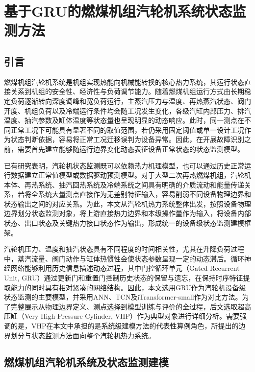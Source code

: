 \section{基于GRU的燃煤机组汽轮机系统状态监测方法}
\label{sec:gru_monitoring}

\subsection{引言}

燃煤机组汽轮机系统是机组实现热能向机械能转换的核心热力系统，其运行状态直接关系到机组的安全性、经济性与负荷调节能力。随着燃煤机组运行方式由长期稳定负荷逐渐转向深度调峰和宽负荷运行，主蒸汽压力与温度、再热蒸汽状态、阀门开度、机组负荷以及冷端运行条件均会随工况发生变化，各级汽缸内部压力、排汽温度、抽汽参数及缸体温度等状态量也呈现明显的动态响应。此时，同一测点在不同正常工况下可能具有显著不同的取值范围，若仍采用固定阈值或单一设计工况作为状态判断依据，容易将正常工况迁移误判为设备异常。因此，在开展故障识别之前，需要首先建立能够随运行边界变化动态表征设备正常状态的状态监测模型。

已有研究表明，汽轮机状态监测既可以依赖热力机理模型，也可以通过历史正常运行数据建立正常值模型或数据驱动预测模型\cite{Dettori2017MonitoringModels,Cao2016LastStageNormalValue,Yu2020HybridDigitalTwin}。对于大型二次再热燃煤机组，汽轮机本体、再热系统、抽汽回热系统及冷端系统之间具有明确的介质流动和能量传递关系，若将全系统大量测点直接作为无差别特征输入，容易削弱不同设备物理边界和状态输出之间的对应关系。为此，本文从汽轮机热力系统整体出发，按照设备物理边界划分状态监测对象，将上游直接热力边界和本级操作量作为输入，将设备内部状态、出口状态及关键热力接口状态作为输出，形成统一的设备级状态监测建模框架。

汽轮机压力、温度和抽汽状态具有不同程度的时间相关性，尤其在升降负荷过程中，蒸汽流量、阀门动作与缸体热惯性会使状态参数呈现一定的动态滞后。循环神经网络能够利用历史信息描述动态过程，其中门控循环单元（Gated Recurrent Unit, GRU）通过更新门和重置门控制历史状态的保留与遗忘，在保持时序特征提取能力的同时具有相对紧凑的网络结构\cite{Cho2014GRU}。因此，本文选用GRU作为汽轮机设备级状态监测的主要模型，并采用ANN、TCN及iTransformer-small作为对比方法。为了完整展示从物理边界定义、测点选择到模型训练与评价的全过程，后文选取超高压缸（Very High Pressure Cylinder, VHP）作为典型对象进行详细分析。需要强调的是，VHP在本文中承担的是系统级建模方法的代表性算例角色，所提出的边界划分与状态监测方法面向整个汽轮机热力系统。

\subsection{燃煤机组汽轮机系统及状态监测建模}
\label{subsec:turbine_monitoring_framework}

